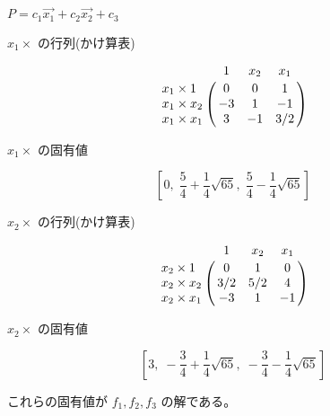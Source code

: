\begin{frame}
$P=c_1\vec{x_1} + c_2\vec{x_2} + c_3$ 

\begin{block}{$x_1 \times $ の行列(かけ算表)}

\[
\bordermatrix{
 &  1 & x_2 & x_1\cr
 x_1\times 1   &  0 &  0 &  1 \cr
 x_1\times x_2 & -3 &  1 & -1 \cr
 x_1\times x_1 &  3 & -1 & 3/2 \cr
}
\]
\end{block}

\begin{block}{$x_1 \times$ の固有値}

\[ \left[ 0, \; \frac{5}{4}+\frac{1}{4}\sqrt{65},
\; \frac{5}{4}-\frac{1}{4}\sqrt{65}\right] \]

\end{block}

\end{frame}

\begin{frame}
\begin{block}{$x_2 \times $ の行列(かけ算表)}

\[
\bordermatrix{
 &  1 & x_2 & x_1\cr
 x_2\times 1   &  0  &  1  &  0 \cr
 x_2\times x_2 & 3/2 & 5/2 &  4 \cr
 x_2\times x_1 & -3  &  1  & -1 \cr
}
\]
\end{block}
\begin{block}{$x_2 \times$ の固有値}

\[ \left[ 3, \; -\frac{3}{4}+\frac{1}{4}\sqrt{65},
\; -\frac{3}{4}-\frac{1}{4}\sqrt{65}\right] \]


\end{block}

これらの固有値が $f_1,f_2,f_3$ の解である。
\end{frame}






